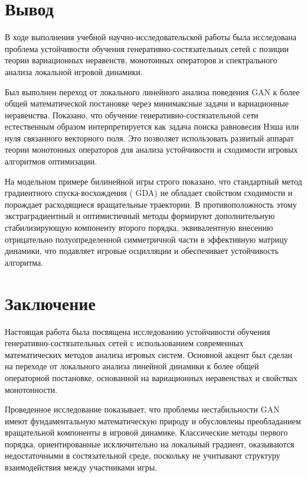 \documentclass[12pt,a4paper]{article}
\begin{document}
	\section{Вывод }
	
	В ходе выполнения учебной научно-исследовательской работы была исследована проблема устойчивости обучения генеративно-состязательных сетей с позиции теории вариационных неравенств, монотонных операторов и спектрального анализа локальной игровой динамики.
	
	Был выполнен переход от локального линейного анализа поведения GAN к более общей математической постановке через минимаксные задачи и вариационные неравенства. Показано, что обучение генеративно-состязательной сети естественным образом интерпретируется как задача поиска равновесия Нэша или нуля связанного векторного поля. Это позволяет использовать развитый аппарат теории монотонных операторов для анализа устойчивости и сходимости игровых алгоритмов оптимизации.
	
	На модельном примере билинейной игры строго показано, что стандартный метод градиентного спуска-восхождения ( GDA) не обладает свойством сходимости и порождает расходящиеся вращательные траектории. В противоположность этому экстраградиентный и оптимистичный методы формируют дополнительную стабилизирующую компоненту второго порядка, эквивалентную внесению отрицательно полуопределенной симметричной части в эффективную матрицу динамики, что подавляет игровые осцилляции и обеспечивает устойчивость алгоритма.

	\section{Заключение}
	
	Настоящая работа была посвящена исследованию устойчивости обучения генеративно-состязательных сетей с использованием современных математических методов анализа игровых систем. Основной акцент был сделан на переходе от локального анализа линейной динамики к более общей операторной постановке, основанной на вариационных неравенствах и свойствах монотонности.
	
	Проведенное исследование показывает, что проблемы нестабильности GAN имеют фундаментальную математическую природу и обусловлены преобладанием вращательной компоненты в игровой динамике. Классические методы первого порядка, ориентированные исключительно на локальный градиент, оказываются недостаточными в состязательной среде, поскольку не учитывают структуру взаимодействия между участниками игры.
	
\end{document}
